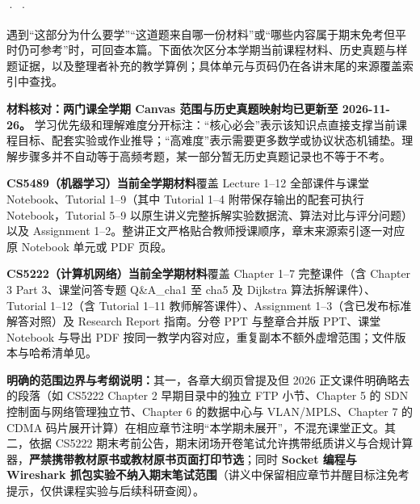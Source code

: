 


 ·  · 


遇到“这部分为什么要学”“这道题来自哪一份材料”或“哪些内容属于期末免考但平时仍可参考”时，可回查本篇。下面依次区分本学期当前课程材料、历史真题与样题证据，以及整理者补充的教学算例；具体单元与页码仍在各讲末尾的来源覆盖索引中查找。

\textbf{材料核对：两门课全学期 Canvas 范围与历史真题映射均已更新至 2026-11-26。} 学习优先级和理解难度分开标注：“核心必会”表示该知识点直接支撑当前课程目标、配套实验或作业推导；“高难度”表示需要更多数学或协议状态机铺垫。理解步骤多并不自动等于高频考题，某一部分暂无历史真题记录也不等于不考。





\textbf{CS5489（机器学习）当前全学期材料}覆盖 Lecture 1–12 全部课件与课堂 Notebook、Tutorial 1–9（其中 Tutorial 1–4 附带保存输出的配套可执行 Notebook，Tutorial 5–9 以原生讲义完整拆解实验数据流、算法对比与评分问题）以及 Assignment 1–2。整讲正文严格贴合教师授课顺序，章末来源索引逐一对应原 Notebook 单元或 PDF 页段。

\textbf{CS5222（计算机网络）当前全学期材料}覆盖 Chapter 1–7 完整课件（含 Chapter 3 Part 3、课堂问答专题 Q\&A\_cha1 至 cha5 及 Dijkstra 算法拆解课件）、Tutorial 1–12（含 Tutorial 1–11 教师解答课件）、Assignment 1–3（含已发布标准解答对照）及 Research Report 指南。分卷 PPT 与整章合并版 PPT、课堂 Notebook 与导出 PDF 按同一教学内容对应，重复副本不额外虚增范围；文件版本与哈希清单见。

\textbf{明确的范围边界与考纲说明：}其一，各章大纲页曾提及但 2026 正文课件明确略去的段落（如 CS5222 Chapter 2 早期目录中的独立 FTP 小节、Chapter 5 的 SDN 控制面与网络管理独立节、Chapter 6 的数据中心与 VLAN/MPLS、Chapter 7 的 CDMA 码片展开计算）在相应章节注明“本学期未展开”，不混充课堂正文。其二，依据 CS5222 期末考前公告，期末闭场开卷笔试允许携带纸质讲义与合规计算器，\textbf{严禁携带教材原书或教材原书页面打印节选}；同时 \textbf{Socket 编程与 Wireshark 抓包实验不纳入期末笔试范围}（讲义中保留相应章节并醒目标注免考提示，仅供课程实验与后续科研查阅）。



